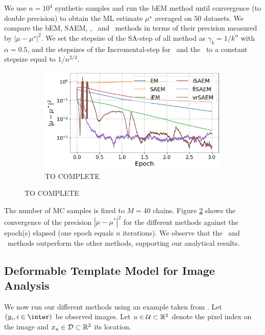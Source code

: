 \documentclass[11pt]{article}
\theoremstyle{t}
\begin{document}
We use $n = 10^4$ synthetic samples and run the bEM method until convergence (to double precision) to obtain the ML estimate $\mu^\star$ averaged on $50$ datasets. We compare the bEM, SAEM, \ISAEM, \SAEMVR\ and \FISAEM\ methods in terms of their precision measured by $| \mu - \mu^\star |^2$. 
We set the stepsize of the \textsf{SA-step} of all method as $\gamma_k = 1/k^{\alpha}$ with $\alpha = 0.5$, and the stepsizes of the \textsf{Incremental-step} for \SAEMVR\ and the \FISAEM\ to a constant stepsize equal to $1/n^{2/3}$. 
\begin{figure}
\begin{minipage}{0.5\textwidth}\vspace{-.9cm}


\begin{figure}[H]
\includegraphics[width=\textwidth]{pic_paper/gmm_tts.png}\vspace{-.2cm}
\caption{TO COMPLETE}\vspace{-.2cm}
\label{fig:gmm_tts}
\end{figure}

\end{minipage}
\end{figure}

The number of MC samples is fixed to $M=40$ chains.
Figure \ref{fig:gmm_tts} shows the convergence of the precision $|\mu - \mu^*|^2$ for the different methods against the epoch(s) elapsed (one epoch equals $n$ iterations). We observe that the \SAEMVR\ and \FISAEM\ methods outperform the other methods, supporting our analytical results.




\subsection{Deformable Template Model for Image Analysis}
We now run our different methods using an example taken from \citep{allassonniere2010construction}.
Let $(y_i, i \in \inter)$ be observed images. 
Let $u \in \mathcal{U} \subset \rset^2$ denote the pixel index on the image and $x_u \in \mathcal{D} \subset \rset^2$ its location.
\end{document}
